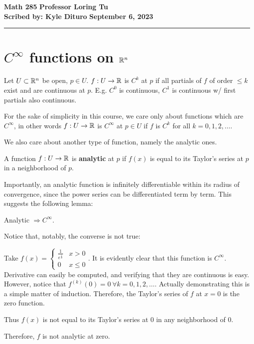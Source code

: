 \documentclass[12pt, twosided]{article}
\begin{document}
\noindent \textbf{Math 285} \hfill \textbf{Professor Loring Tu} \\
\textbf{Scribed by: Kyle Dituro} \hfill \textbf{September 6\tht, 2023}\hrule
\vspace{.2in}

\section{\texorpdfstring{\(C^\infty\)}{TEXT} functions on \texorpdfstring{\(\mathbb{R}^n\)}{TEXT}}

\begin{df}
  Let \(U \subset \mathbb{R}^n\) be open, \(p \in U\). \(f: U \to \mathbb{R}\) is \(C^k\) at \(p\) if all partials of \(f\) of order \(\leq k\) exist and are continuous at \(p\). E.g. \(C^0\) is continuous, \(C^1\) is continuous w/ first partials also continuous.
\end{df}

For the sake of simplicity in this course, we care only about functions which are \(C^\infty\), in other words \(f: U \to \mathbb{R}\) is \(C^\infty\) at \(p \in U\) if \(f\) is \(C^k\) for all \(k = 0, 1, 2, \ldots\).

We also care about another type of function, namely the analytic ones.

\begin{df}
  A function \(f: U \to \mathbb{R}\) is \textbf{analytic} at \(p\) if \(f(x)\) is equal to its Taylor's series at \(p\) in a neighborhood of \(p\).
\end{df}

Importantly, an analytic function is infinitely differentiable within its radius of convergence, since the power series can be differentiated term by term. This suggests the following lemma:

\begin{lm}
  Analytic \(\Rightarrow C^\infty\).
\end{lm}

Notice that, notably, the converse is not true:

\begin{exa}
  Take \(f(x) =
  \begin{cases}
    \frac{1}{e^{\frac{1}{x}}} & x > 0 \\
    0 & x \leq 0
  \end{cases}
  \). It is evidently clear that this function is \(C^\infty\). Derivative can easily be computed, and verifying that they are continuous is easy. However, notice that \(f^{(k)}(0) = 0\ \forall k = 0, 1, 2, \ldots\). Actually demonstrating this is a simple matter of induction. Therefore, the Taylor's series of \(f\) at \(x = 0\) is the zero function.

  Thus \(f(x)\) is not equal to its Taylor's series at \(0\) in any neighborhood of \(0\).

  Therefore, \(f\) is not analytic at zero.
\end{exa}
\end{document}
